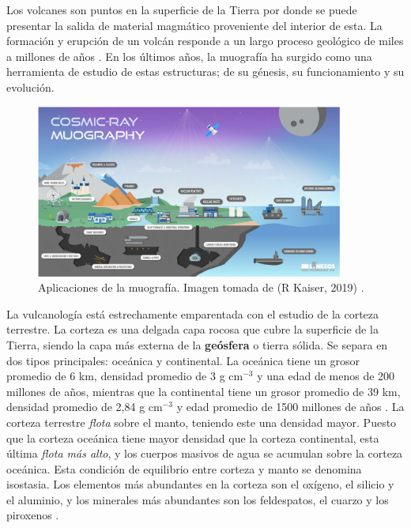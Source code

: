 \documentclass[12pt]{report}
\begin{document}
Los volcanes son puntos en la superficie de la Tierra por donde se puede presentar la salida de material magmático proveniente del interior de esta. La formación y erupción de un volcán responde a un largo proceso geológico de miles a millones de años \cite{vesga2018inversion}. En los últimos años, la muografía ha surgido como una herramienta de estudio de estas estructuras; de su génesis, su funcionamiento y su evolución.

\begin{figure}
    \centering
    \includegraphics[width=0.9\textwidth]{images/applications.png}
    \caption{Aplicaciones de la muografía. Imagen tomada de (R Kaiser, 2019) \cite{kaiser2019muography}.}
    \label{fig:applications}
\end{figure}

La vulcanología está estrechamente emparentada con el estudio de la corteza terrestre. La corteza es una delgada capa rocosa que cubre la superficie de la Tierra, siendo la capa más externa de la \textbf{geósfera} o tierra sólida. Se separa en dos tipos principales: oceánica y continental. La oceánica tiene un grosor promedio de 6 km, densidad promedio de 3 g cm$^{-3}$ y una edad de menos de 200 millones de años, mientras que la continental tiene un grosor promedio de 39 km, densidad promedio de 2,84 g cm$^{-3}$ y edad promedio de 1500 millones de años \cite{mooney20101}. La corteza terrestre \textit{flota} sobre el manto, teniendo este una densidad mayor. Puesto que la corteza oceánica tiene mayor densidad que la corteza continental, esta última \textit{flota más alto}, y los cuerpos masivos de agua se acumulan sobre la corteza oceánica. Esta condición de equilibrio entre corteza y manto se denomina isostasia. Los elementos más abundantes en la corteza son el oxígeno, el silicio y el aluminio, y los minerales más abundantes son los feldespatos, el cuarzo y los piroxenos \cite{anderson2010geomorphology}.
\end{document}
